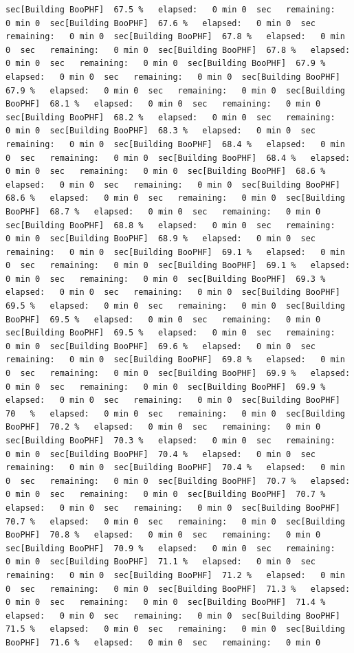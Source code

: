\documentclass[
]{book}
\begin{document}
\begin{verbatim}
sec[Building BooPHF]  67.5 %   elapsed:   0 min 0  sec   remaining:   0 min 0  sec[Building BooPHF]  67.6 %   elapsed:   0 min 0  sec   remaining:   0 min 0  sec[Building BooPHF]  67.8 %   elapsed:   0 min 0  sec   remaining:   0 min 0  sec[Building BooPHF]  67.8 %   elapsed:   0 min 0  sec   remaining:   0 min 0  sec[Building BooPHF]  67.9 %   elapsed:   0 min 0  sec   remaining:   0 min 0  sec[Building BooPHF]  67.9 %   elapsed:   0 min 0  sec   remaining:   0 min 0  sec[Building BooPHF]  68.1 %   elapsed:   0 min 0  sec   remaining:   0 min 0  sec[Building BooPHF]  68.2 %   elapsed:   0 min 0  sec   remaining:   0 min 0  sec[Building BooPHF]  68.3 %   elapsed:   0 min 0  sec   remaining:   0 min 0  sec[Building BooPHF]  68.4 %   elapsed:   0 min 0  sec   remaining:   0 min 0  sec[Building BooPHF]  68.4 %   elapsed:   0 min 0  sec   remaining:   0 min 0  sec[Building BooPHF]  68.6 %   elapsed:   0 min 0  sec   remaining:   0 min 0  sec[Building BooPHF]  68.6 %   elapsed:   0 min 0  sec   remaining:   0 min 0  sec[Building BooPHF]  68.7 %   elapsed:   0 min 0  sec   remaining:   0 min 0  sec[Building BooPHF]  68.8 %   elapsed:   0 min 0  sec   remaining:   0 min 0  sec[Building BooPHF]  68.9 %   elapsed:   0 min 0  sec   remaining:   0 min 0  sec[Building BooPHF]  69.1 %   elapsed:   0 min 0  sec   remaining:   0 min 0  sec[Building BooPHF]  69.1 %   elapsed:   0 min 0  sec   remaining:   0 min 0  sec[Building BooPHF]  69.3 %   elapsed:   0 min 0  sec   remaining:   0 min 0  sec[Building BooPHF]  69.5 %   elapsed:   0 min 0  sec   remaining:   0 min 0  sec[Building BooPHF]  69.5 %   elapsed:   0 min 0  sec   remaining:   0 min 0  sec[Building BooPHF]  69.5 %   elapsed:   0 min 0  sec   remaining:   0 min 0  sec[Building BooPHF]  69.6 %   elapsed:   0 min 0  sec   remaining:   0 min 0  sec[Building BooPHF]  69.8 %   elapsed:   0 min 0  sec   remaining:   0 min 0  sec[Building BooPHF]  69.9 %   elapsed:   0 min 0  sec   remaining:   0 min 0  sec[Building BooPHF]  69.9 %   elapsed:   0 min 0  sec   remaining:   0 min 0  sec[Building BooPHF]  70   %   elapsed:   0 min 0  sec   remaining:   0 min 0  sec[Building BooPHF]  70.2 %   elapsed:   0 min 0  sec   remaining:   0 min 0  sec[Building BooPHF]  70.3 %   elapsed:   0 min 0  sec   remaining:   0 min 0  sec[Building BooPHF]  70.4 %   elapsed:   0 min 0  sec   remaining:   0 min 0  sec[Building BooPHF]  70.4 %   elapsed:   0 min 0  sec   remaining:   0 min 0  sec[Building BooPHF]  70.7 %   elapsed:   0 min 0  sec   remaining:   0 min 0  sec[Building BooPHF]  70.7 %   elapsed:   0 min 0  sec   remaining:   0 min 0  sec[Building BooPHF]  70.7 %   elapsed:   0 min 0  sec   remaining:   0 min 0  sec[Building BooPHF]  70.8 %   elapsed:   0 min 0  sec   remaining:   0 min 0  sec[Building BooPHF]  70.9 %   elapsed:   0 min 0  sec   remaining:   0 min 0  sec[Building BooPHF]  71.1 %   elapsed:   0 min 0  sec   remaining:   0 min 0  sec[Building BooPHF]  71.2 %   elapsed:   0 min 0  sec   remaining:   0 min 0  sec[Building BooPHF]  71.3 %   elapsed:   0 min 0  sec   remaining:   0 min 0  sec[Building BooPHF]  71.4 %   elapsed:   0 min 0  sec   remaining:   0 min 0  sec[Building BooPHF]  71.5 %   elapsed:   0 min 0  sec   remaining:   0 min 0  sec[Building BooPHF]  71.6 %   elapsed:   0 min 0  sec   remaining:   0 min 0  
\end{verbatim}
\end{document}
